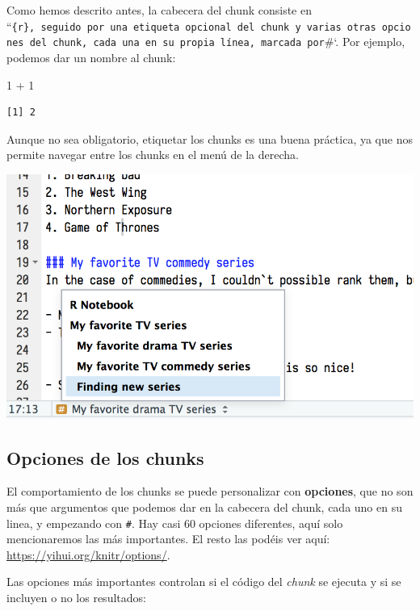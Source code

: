 \documentclass[
  letterpaper,
  DIV=11,
  numbers=noendperiod]{scrreprt}
\newenvironment{Shaded}{\begin{snugshade}}{\end{snugshade}}
\newcommand{\DecValTok}[1]{\textcolor[rgb]{0.68,0.00,0.00}{#1}}
\newcommand{\SpecialCharTok}[1]{\textcolor[rgb]{0.37,0.37,0.37}{#1}}
\begin{document}
Como hemos descrito antes, la cabecera del chunk consiste en
``\texttt{\{r\},\ seguido\ por\ una\ etiqueta\ opcional\ del\ chunk\ y\ varias\ otras\ opciones\ del\ chunk,\ cada\ una\ en\ su\ propia\ línea,\ marcada\ por}\#\textbar`.
Por ejemplo, podemos dar un nombre al chunk:

\begin{Shaded}
\begin{Highlighting}[]
\DecValTok{1} \SpecialCharTok{+} \DecValTok{1}
\end{Highlighting}
\end{Shaded}

\begin{verbatim}
[1] 2
\end{verbatim}

Aunque no sea obligatorio, etiquetar los chunks es una buena práctica,
ya que nos permite navegar entre los chunks en el menú de la derecha.

\includegraphics{images/02-intro-rmarkdown/chunk_guide.png}

\hypertarget{opciones-de-los-chunks}{%
\subsection{Opciones de los chunks}\label{opciones-de-los-chunks}}

El comportamiento de los chunks se puede personalizar con
\textbf{opciones}, que no son más que argumentos que podemos dar en la
cabecera del chunk, cada uno en su linea, y empezando con
\texttt{\#\textbar{}}. Hay casi 60 opciones diferentes, aquí solo
mencionaremos las más importantes. El resto las podéis ver aquí:
\url{https://yihui.org/knitr/options/}.

Las opciones más importantes controlan si el código del \emph{chunk} se
ejecuta y si se incluyen o no los resultados:
\end{document}
